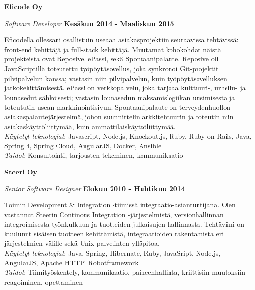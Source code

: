 \documentclass[10pt,finnish,a4paper]{article}
\newenvironment{outerlist}[1][\enskip\textbullet]%
        {\begin{itemize}[#1]}{\end{itemize}%
         \vspace{-.6\baselineskip}}
\newenvironment{innerlist}[1][\enskip\textbullet]%
        {\begin{compactitem}[#1]}{\end{compactitem}}
\newcommand{\blankline}{\quad\pagebreak[2]}
\begin{document}
\href{http://eficode.fi/}{\textbf{Eficode Oy}}
\begin{outerlist}

  \item[] \textit{Software Developer}%
  \hfill \textbf{Kesäkuu 2014 - Maaliskuu 2015}
  \begin{innerlist}
    \item Eficodella ollessani osallistuin useaan asiakasprojektiin seuraavissa tehtävissä: front-end kehittäjä ja full-stack kehittäjä. Muutamat kohokohdat näistä projekteista ovat Reposive, ePassi, sekä Spontaanipalaute.
Reposive oli JavaScriptillä toteutettu työpöytäsovellus, joka synkronoi Git-projektit pilvipalvelun kanssa; vastasin niin pilvipalvelun, kuin työpöytäsovelluksen jatkokehittämisestä.
ePassi on verkkopalvelu, joka tarjoaa kulttuuri-, urheilu- ja lounasedut sähköisesti; vastasin lounasedun maksamislogiikan uusimisesta ja toteututin usean markkinointisivun.
Spontaanipalaute on terveydenhuollon asiakaspalautejärjestelmä, johon suunnittelin arkkitehtuurin ja toteutin niin asiakaskäyttöliittymää, kuin ammattilaiskäyttöliittymää.\\

    \emph{Käytetyt teknologiat}: Javascript, Node.js, Knockout.js, Ruby, Ruby on Rails, Java, Spring 4, Spring Cloud, AngularJS, Docker, Ansible\\
    \emph{Taidot}: Konsultointi, tarjousten tekeminen, kommunikaatio
  \end{innerlist}
\end{outerlist}
\blankline


\href{http://steeri.fi/}{\textbf{Steeri Oy}}
\begin{outerlist}

\item[] \textit{Senior Software Designer}
    \hfill \textbf{Elokuu 2010 - Huhtikuu 2014}
    \begin{innerlist}
		\item Toimin Development \& Integration -tiimissä integraatio-asiantuntijana. Olen vastannut Steerin Continous Integration -järjestelmistä, versionhallinnan integroimisesta työnkulkuun ja tuotteiden julkaisujen hallinnasta. Tehtäviini on kuulunut sisäisen tuotteen kehittämistä, integraatioiden rakentamista eri järjestelmien välille sekä Unix palvelinten ylläpitoa.\\


         \emph{Käytetyt teknologiat}: Java, Spring, Hibernate, Ruby, JavaSript, Node.js, AngularJS, Apache HTTP, Robotframework\\
         \emph{Taidot}: Tiimityöskentely, kommunikaatio, paineenhallinta, kriittisiin muutoksiin reagoiminen, opettaminen
    \end{innerlist}
\end{outerlist}
\blankline
\end{document}
